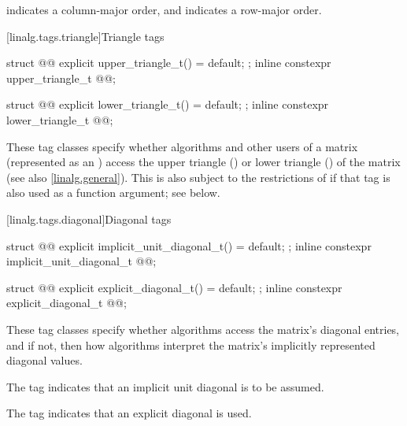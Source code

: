 \begin{itemdescr}
\pnum
{} indicates a column-major order,
and  indicates a row-major order.
\end{itemdescr}

[linalg.tags.triangle]{Triangle tags}

\begin{itemdecl}
struct @@ {
  explicit upper_triangle_t() = default;
};
inline constexpr upper_triangle_t @@{};

struct @@ {
  explicit lower_triangle_t() = default;
};
inline constexpr lower_triangle_t @@{};
\end{itemdecl}

\begin{itemdescr}
\pnum
These tag classes specify whether
algorithms and other users of a matrix (represented as an )
access the
upper triangle () or
lower triangle ()
of the matrix (see also \ref{linalg.general}).
This is also subject to the restrictions of 
if that tag is also used as a function argument; see below.
\end{itemdescr}

[linalg.tags.diagonal]{Diagonal tags}

\begin{itemdecl}
struct @@ {
  explicit implicit_unit_diagonal_t() = default;
};
inline constexpr implicit_unit_diagonal_t @@{};

struct @@ {
  explicit explicit_diagonal_t() = default;
};
inline constexpr explicit_diagonal_t @@{};
\end{itemdecl}

\begin{itemdescr}
\pnum
These tag classes specify whether algorithms
access the matrix's diagonal entries, and if not,
then how algorithms interpret
the matrix's implicitly represented diagonal values.

\pnum
The  tag indicates that
an implicit unit diagonal is to be assumed.

\pnum
The  tag indicates that
an explicit diagonal is used.
\end{itemdescr}

